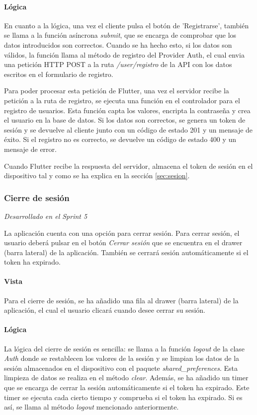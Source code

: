 \paragraph*{Lógica}
En cuanto a la lógica, una vez el cliente pulsa el botón de 'Registrarse', también se llama a la función asíncrona \textit{submit}, que se encarga de comprobar que los datos introducidos 
son correctos. Cuando se ha hecho esto, si los datos son válidos, la función llama al método de registro del Provider Auth, el cual envia una petición HTTP POST a la ruta \textit{/user/registro}
 de la API con los datos escritos en el formulario de registro. 

Para poder procesar esta petición de Flutter, una vez el servidor recibe la petición a la ruta de registro, se ejecuta una función en el controlador para el registro de usuarios.
 Esta función capta los valores, encripta la contraseña y crea el usuario en la base de datos. Si los datos son correctos, se genera un token de sesión y
  se devuelve al cliente junto con un código de estado 201 y un mensaje de éxito. Si el registro no es correcto, se devuelve un código de estado 400 y un mensaje de error.

  Cuando Flutter recibe la respuesta del servidor, almacena el token de sesión en el dispositivo tal y como se ha explica en la sección \ref{sec:sesion}.

\subsubsection{Cierre de sesión}
\textit{Desarrollado en el Sprint 5}
\label{sec:logout}

La aplicación cuenta con una opción para cerrar sesión. Para cerrar sesión, el usuario deberá pulsar en el botón \textit{Cerrar sesión} que se encuentra en el drawer (barra lateral) de la aplicación. También se cerrará sesión automáticamente si el token ha expirado.

\paragraph*{Vista}
Para el cierre de sesión, se ha añadido una fila al drawer (barra lateral) de la aplicación, el cual el usuario clicará cuando desee cerrar su sesión.

\paragraph*{Lógica}
La lógica del cierre de sesión es sencilla: se llama a la función \textit{logout} de la clase \textit{Auth} donde se restablecen los valores de la sesión y se limpian los datos de la sesión almacenados en el dispositivo con el paquete \textit{shared\_preferences}. 
Esta limpieza de datos se realiza en el método \textit{clear}.
Además, se ha añadido un timer que se encarga de cerrar la sesión automáticamente si el token ha expirado. Este timer se ejecuta cada cierto tiempo y comprueba si el token ha expirado. Si es así, se llama al método \textit{logout} mencionado anteriormente.

